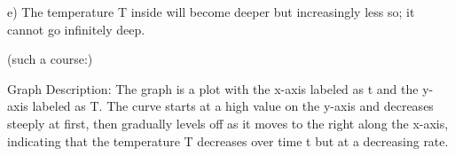 e) The temperature T inside will become deeper but increasingly less so; it cannot go infinitely deep.

(such a course:)

Graph Description: The graph is a plot with the x-axis labeled as t and the y-axis labeled as T. The curve starts at a high value on the y-axis and decreases steeply at first, then gradually levels off as it moves to the right along the x-axis, indicating that the temperature T decreases over time t but at a decreasing rate.